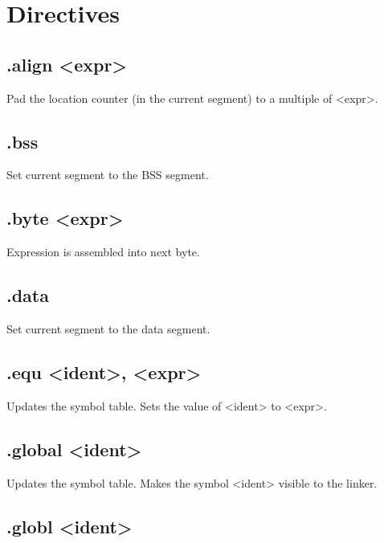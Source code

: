 \documentclass[
   a4paper,
   twoside,
   bringhurst,
   palatino,
   english,
   titlepage,
   fleqn
]{refman}
\begin{document}
   \dominitoc
   \dominilof
   \dominilot

   
   \cleardoublepage
   \thispagestyle{empty}
   \tableofcontents

    \chapter{Directives}

    \section{.align <expr>}

    Pad the location counter (in the current segment) to a multiple of
    <expr>.

    \section{.bss}

    Set current segment to the BSS segment.

    \section{.byte <expr>}

    Expression is assembled into next byte.

    \section{.data}

    Set current segment to the data segment.

    \section{.equ <ident>, <expr>}

    Updates the symbol table. Sets the value of <ident> to <expr>.

    \section{.global <ident>}

    Updates the symbol table. Makes the symbol <ident> visible to the linker.


    \section{.globl <ident>}
\end{document}
